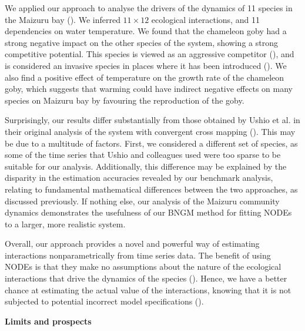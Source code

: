 \documentclass[11pt, oneside]{article}
\begin{document}
We applied our approach to analyse the drivers of the dynamics of 11 species in the Maizuru bay (\cite{Ushio2018}).
We inferred $11 \times 12$ ecological interactions, and 11 dependencies on water temperature.
We found that the chameleon goby had a strong negative impact on the other species of the system, showing a strong competitive potential.
This species is viewed as an aggressive competitor (\cite{Ushio2018}), and is considered an invasive species in places where it has been introduced (\cite{Goren2009}).
We also find a positive effect of temperature on the growth rate of the chameleon goby, which suggests that warming could have indirect negative effects on many species on Maizuru bay by favouring the reproduction of the goby.

Surprisingly, our results differ substantially from those obtained by Ushio et al. in their original analysis of the system with convergent cross mapping (\cite{Ushio2018}).
This may be due to a multitude of factors.
First, we considered a different set of species, as some of the time series that Ushio and colleagues used were too sparse to be suitable for our analysis.
Additionally, this difference may be explained by the disparity in the estimation accuracies revealed by our benchmark analysis, relating to fundamental mathematical differences between the two approaches, as discussed previously.
If nothing else, our analysis of the Maizuru community dynamics demonstrates the usefulness of our BNGM method for fitting NODEs to a larger, more realistic system.

Overall, our approach provides a novel and powerful way of estimating interactions nonparametrically from time series data.
The benefit of using NODEs is that they make no assumptions about the nature of the ecological interactions that drive the dynamics of the species (\cite{Chen2018,Bonnaffe2021a}). 
Hence, we have a better chance at estimating the actual value of the interactions, knowing that it is not subjected to potential incorrect model specifications (\cite{Jost2000,Ellner2002,Wu2005,Kendall2005,Adamson2013}).


\textbf{Limits and prospects}
\end{document}
